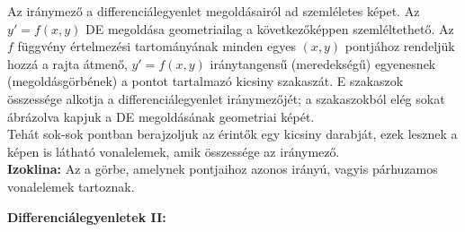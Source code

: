 \documentclass[11pt,a4paper]{article}
\begin{document}
    \begin{tcolorbox}[colback=red!5!white,colframe=red!60!black,title= 6. Iránymező]
        Az iránymező a differenciálegyenlet megoldásairól ad szemléletes képet. Az $y' = f(x,y)$ DE megoldása geometriailag a következőképpen szemléltethető. Az $f$ függvény értelmezési tartományának minden egyes $(x,y)$ pontjához rendeljük hozzá a rajta átmenő, $y' = f(x,y)$ iránytangensű (meredekségű) egyenesnek (megoldásgörbének) a pontot tartalmazó kicsiny szakaszát. E szakaszok összessége alkotja a differenciálegyenlet iránymezőjét; a szakaszokból elég sokat ábrázolva kapjuk a DE megoldásának geometriai képét.\\
        Tehát sok-sok pontban berajzoljuk az érintők egy kicsiny darabját, ezek lesznek a képen is látható vonalelemek, amik összessége az iránymező.\\
        \textbf{Izoklina:} Az a görbe, amelynek pontjaihoz azonos irányú, vagyis párhuzamos vonalelemek tartoznak.
        \begin{center}
        \end{center}
    \end{tcolorbox}

\newpage
\textbf{Differenciálegyenletek II:}    
\end{document}
